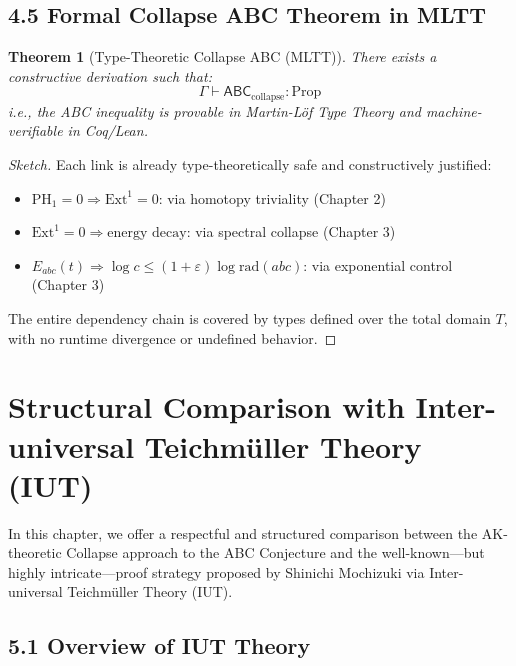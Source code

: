 \documentclass[11pt]{article}
\newtheorem{theorem}{Theorem}[section]
\begin{document}
\subsection{4.5 Formal Collapse ABC Theorem in MLTT}

\begin{theorem}[Type-Theoretic Collapse ABC (MLTT)]
There exists a constructive derivation such that:
\[
\Gamma \vdash \mathsf{ABC}_{\text{collapse}} : \mathrm{Prop}
\]
i.e., the ABC inequality is provable in Martin-Löf Type Theory and machine-verifiable in Coq/Lean.
\end{theorem}

\begin{proof}[Sketch]
Each link is already type-theoretically safe and constructively justified:
\begin{itemize}
  \item \( \mathrm{PH}_1 = 0 \Rightarrow \mathrm{Ext}^1 = 0 \): via homotopy triviality (Chapter 2)
  \item \( \mathrm{Ext}^1 = 0 \Rightarrow \text{energy decay} \): via spectral collapse (Chapter 3)
  \item \( E_{abc}(t) \Rightarrow \log c \leq (1+\varepsilon) \log \mathrm{rad}(abc) \): via exponential control (Chapter 3)
\end{itemize}
The entire dependency chain is covered by types defined over the total domain \( T \), with no runtime divergence or undefined behavior.
\end{proof}



\section{Structural Comparison with Inter-universal Teichmüller Theory (IUT)}

In this chapter, we offer a respectful and structured comparison between the AK-theoretic Collapse approach to the ABC Conjecture and the well-known—but highly intricate—proof strategy proposed by Shinichi Mochizuki via Inter-universal Teichmüller Theory (IUT).

\subsection{5.1 Overview of IUT Theory}
\end{document}
